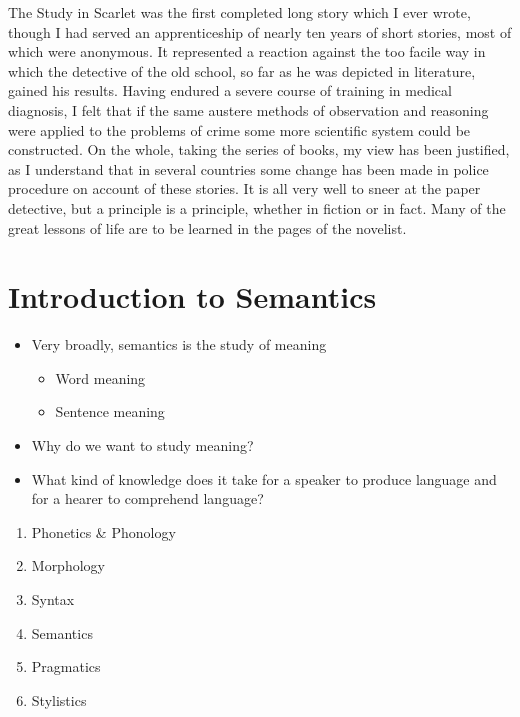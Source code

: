 \documentclass[a4paper,landscape,headrule,footrule,xetex,25pt]{foils}
\begin{document}
The Study in Scarlet was the first completed long story which I ever
wrote, though I had served an apprenticeship of nearly ten years of
short stories, most of which were anonymous. It represented a reaction
against the too facile way in which the detective of the old school,
so far as he was depicted in literature, gained his results. Having
endured a severe course of training in medical diagnosis, I felt that
if the same austere methods of observation and reasoning were applied
to the problems of crime some more scientific system could be
constructed. On the whole, taking the series of books, my view has
been justified, as I understand that in several countries some change
has been made in police procedure on account of these stories. It is
all very well to sneer at the paper detective, but a principle is a
principle, whether in fiction or in fact. Many of the great lessons of
life are to be learned in the pages of the novelist.



\section{Introduction to Semantics}

\begin{itemize}
\item Very broadly, semantics is the study of meaning
  \begin{itemize}
  \item Word meaning
  \item Sentence meaning
  \end{itemize}
\item Why do we want to study meaning?
\item What kind of knowledge does it take for a speaker to produce language and for a hearer to comprehend language? 
\end{itemize}

\begin{enumerate}\addtolength{\itemsep}{-0.75ex}
\item Phonetics \& Phonology
\item Morphology
\item Syntax
\item Semantics
\item Pragmatics
\item Stylistics
\end{enumerate}
\end{document}
